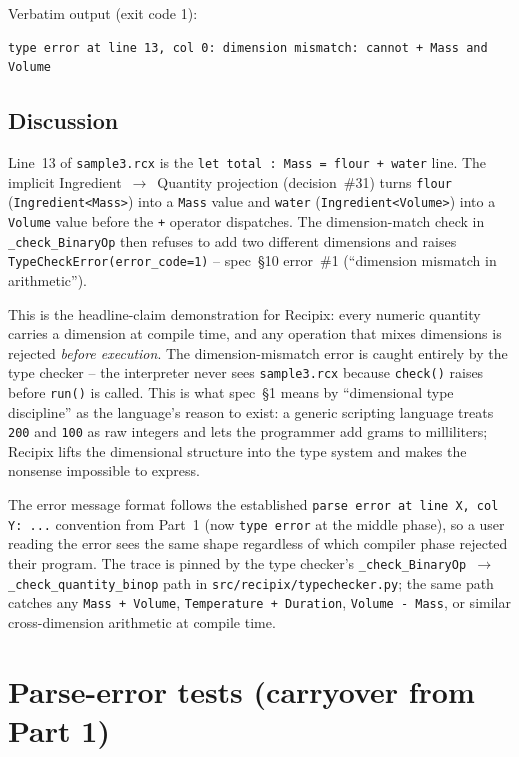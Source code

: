 \documentclass[11pt,a4paper]{article}
\begin{document}
Verbatim output (exit code 1):

\begin{lstlisting}[style=errmsg]
type error at line 13, col 0: dimension mismatch: cannot + Mass and Volume
\end{lstlisting}

\subsection*{Discussion}

Line~13 of \texttt{sample3.rcx} is the \texttt{let total : Mass = flour
+ water} line. The implicit Ingredient~$\to$~Quantity projection
(decision~\#31) turns \texttt{flour} (\texttt{Ingredient<Mass>}) into a
\texttt{Mass} value and \texttt{water} (\texttt{Ingredient<Volume>})
into a \texttt{Volume} value before the \texttt{+} operator
dispatches. The dimension-match check in \texttt{\_check\_BinaryOp}
then refuses to add two different dimensions and raises
\texttt{TypeCheckError(error\_code=1)} -- spec~\S10 error~\#1
(``dimension mismatch in arithmetic'').

This is the headline-claim demonstration for Recipix: every numeric
quantity carries a dimension at compile time, and any operation that
mixes dimensions is rejected \emph{before execution}. The
dimension-mismatch error is caught entirely by the type checker --
the interpreter never sees \texttt{sample3.rcx} because
\texttt{check()} raises before \texttt{run()} is called. This is what
spec~\S1 means by ``dimensional type discipline'' as the language's
reason to exist: a generic scripting language treats \texttt{200} and
\texttt{100} as raw integers and lets the programmer add grams to
milliliters; Recipix lifts the dimensional structure into the type
system and makes the nonsense impossible to express.

The error message format follows the established \texttt{parse error
at line X, col Y: ...} convention from Part~1 (now \texttt{type error}
at the middle phase), so a user reading the error sees the same shape
regardless of which compiler phase rejected their program. The trace
is pinned by the type checker's \texttt{\_check\_BinaryOp $\to$
\_check\_quantity\_binop} path in \texttt{src/recipix/typechecker.py};
the same path catches any \texttt{Mass + Volume}, \texttt{Temperature
+ Duration}, \texttt{Volume - Mass}, or similar cross-dimension
arithmetic at compile time.


\section{Parse-error tests (carryover from Part 1)}
\end{document}

